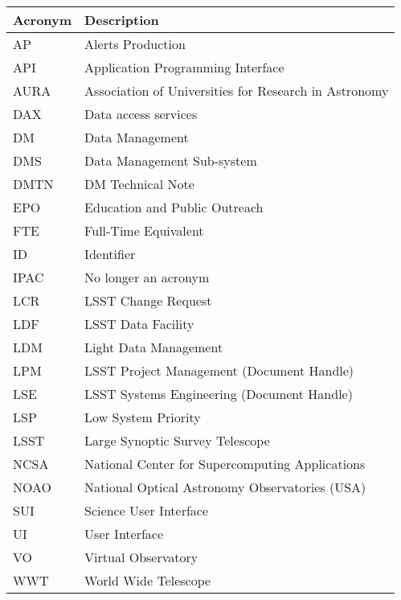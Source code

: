 \addtocounter{table}{-1}
\begin{longtable}{|l|p{}|}\hline
\textbf{Acronym} & \textbf{Description}  \\\hline

AP & Alerts Production \\\hline
API & Application Programming Interface \\\hline
AURA & Association of Universities for Research in Astronomy \\\hline
DAX & Data access services \\\hline
DM & Data Management \\\hline
DMS & Data Management Sub-system \\\hline
DMTN & DM Technical Note \\\hline
EPO & Education and Public Outreach \\\hline
FTE & Full-Time Equivalent \\\hline
ID & Identifier \\\hline
IPAC & No longer an acronym \\\hline
LCR & LSST Change Request \\\hline
LDF & LSST Data Facility \\\hline
LDM & Light Data Management \\\hline
LPM & LSST Project Management (Document Handle) \\\hline
LSE & LSST Systems Engineering (Document Handle) \\\hline
LSP & Low System Priority \\\hline
LSST & Large Synoptic Survey Telescope \\\hline
NCSA & National Center for Supercomputing Applications \\\hline
NOAO & National Optical Astronomy Observatories (USA) \\\hline
SUI & Science User Interface \\\hline
UI & User Interface \\\hline
VO & Virtual Observatory \\\hline
WWT & World Wide Telescope \\\hline
\end{longtable}
